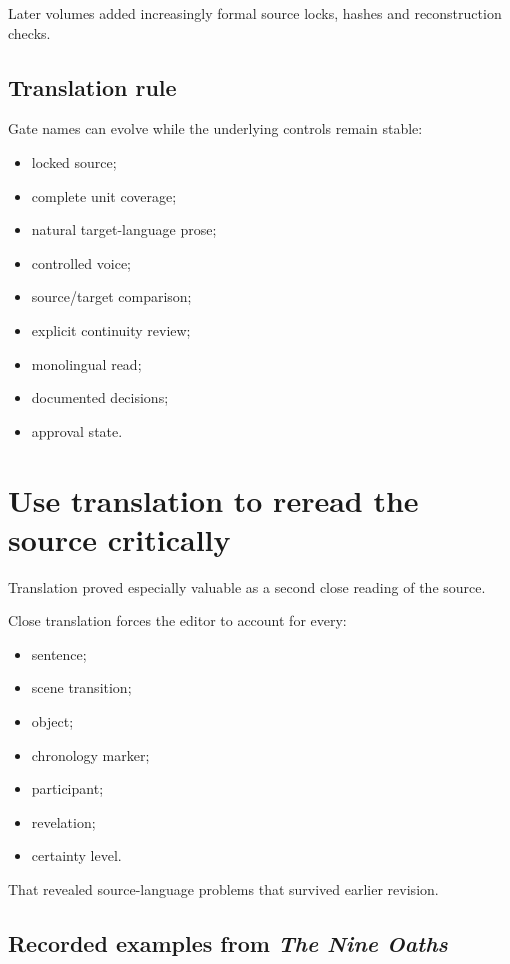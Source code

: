 \documentclass[11pt,oneside,openany]{book}
\providecommand{\tightlist}{%
  \setlength{\itemsep}{0pt}\setlength{\parskip}{0pt}}
\begin{document}
Later volumes added increasingly formal source locks, hashes and reconstruction checks.

\section{Translation rule}\label{translation-rule}

Gate names can evolve while the underlying controls remain stable:

\begin{itemize}
\tightlist
\item
  locked source;
\item
  complete unit coverage;
\item
  natural target-language prose;
\item
  controlled voice;
\item
  source/target comparison;
\item
  explicit continuity review;
\item
  monolingual read;
\item
  documented decisions;
\item
  approval state.
\end{itemize}

\chapter{Use translation to reread the source critically}

Translation proved especially valuable as a second close reading of the source.

Close translation forces the editor to account for every:

\begin{itemize}
\tightlist
\item
  sentence;
\item
  scene transition;
\item
  object;
\item
  chronology marker;
\item
  participant;
\item
  revelation;
\item
  certainty level.
\end{itemize}

That revealed source-language problems that survived earlier revision.

\section{\texorpdfstring{Recorded examples from \emph{The Nine Oaths}}{Recorded examples from The Nine Oaths}}\label{recorded-examples-from-the-nine-oaths}
\end{document}
